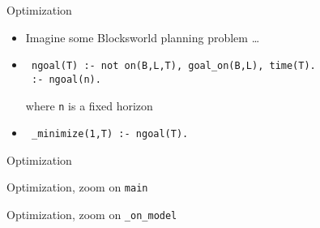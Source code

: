 \begin{frame}[fragile]{Optimization}
  \bigskip
  \begin{itemize}
  \item Imagine some Blocksworld planning problem \dots
    \smallskip
  \item {}
\begin{lstlisting}
 ngoal(T) :- not on(B,L,T), goal_on(B,L), time(T).
 :- ngoal(n).
\end{lstlisting}
    where \texttt{n} is a fixed horizon
    \medskip
  \item<2-> 
\begin{lstlisting}
 _minimize(1,T) :- ngoal(T).
\end{lstlisting}
  \end{itemize}
\end{frame}
\begin{frame}{Optimization}
  
\end{frame}
\begin{frame}[fragile,shrink=37]{Optimization, zoom on \texttt{main}}
  \bigskip
  
\end{frame}
\begin{frame}[fragile,shrink=25]{Optimization, zoom on \texttt{\_on\_model}}
  \bigskip
  
\end{frame}
%
